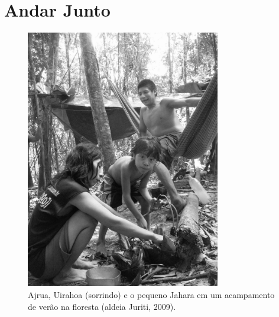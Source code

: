
\chapter{Andar Junto}\label{andar-junto}

\begin{figure}[H]
\centering
\captionsetup{width=85mm}
  \includegraphics[width=85mm]{./imgs/100_4966}
\caption{Ajrua, Uirahoa (sorrindo) e o pequeno Jahara em um acampamento de verão na
floresta (aldeia Juriti, 2009).}
\end{figure}

